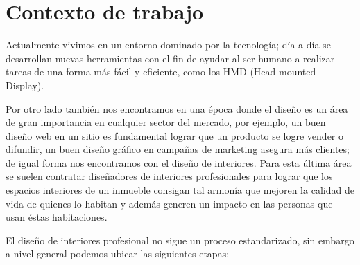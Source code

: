 \section{Contexto de trabajo}

Actualmente vivimos en un entorno dominado por la tecnología; día a día se desarrollan nuevas herramientas con el fin de ayudar al ser humano a realizar tareas de una forma más fácil y eficiente, como los HMD (Head-mounted Display)\cite{B15}.


Por otro lado también nos encontramos en una época donde el diseño es un área de gran importancia en cualquier sector del mercado, por ejemplo, un buen diseño web en un sitio es fundamental lograr que un producto se logre vender o difundir, un buen diseño gráfico en campañas de marketing asegura más clientes; de igual forma nos encontramos con el diseño de interiores. Para esta última área se suelen contratar diseñadores de interiores profesionales para lograr que los espacios interiores de un inmueble consigan tal armonía que mejoren la calidad de vida de quienes lo habitan y además generen un impacto en las personas que usan éstas habitaciones.\par
El diseño de interiores profesional no sigue un proceso estandarizado, sin embargo a nivel general podemos ubicar las siguientes etapas:


